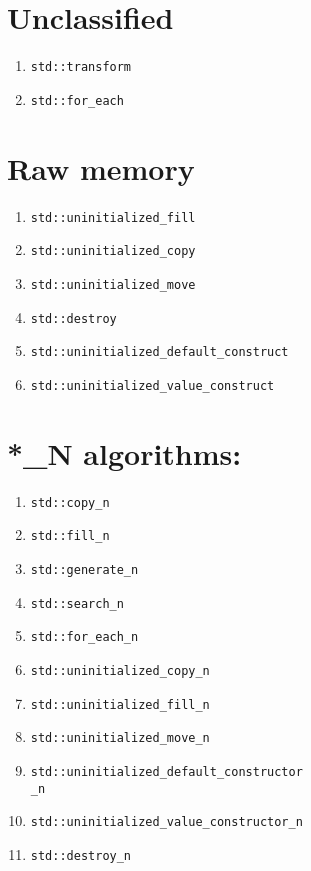 \documentclass{article}
\begin{document}
\begin{multicols}{3}
\section{Unclassified}
\begin{enumerate}[resume]
\setlength\itemsep{0em}
\item \texttt{std::transform}
\item \texttt{std::for\_each}
\end{enumerate}

\section{Raw memory}
\begin{enumerate}[resume]
\setlength\itemsep{0em}
\item \texttt{std::uninitialized\_fill}
\item \texttt{std::uninitialized\_copy}
\item \texttt{std::uninitialized\_move}
\item \texttt{std::destroy}
\item \small{\texttt{std::uninitialized\_default\_construct}}
\item \texttt{std::uninitialized\_value\_construct}
\end{enumerate}

\section{*\_N algorithms:}
\begin{enumerate}[resume]
\setlength\itemsep{0em}
\item \texttt{std::copy\_n}
\item \texttt{std::fill\_n}
\item \texttt{std::generate\_n}
\item \texttt{std::search\_n}
\item \texttt{std::for\_each\_n}
\item \texttt{std::uninitialized\_copy\_n}
\item \texttt{std::uninitialized\_fill\_n}
\item \texttt{std::uninitialized\_move\_n}
\item \small{\texttt{std::uninitialized\_default\_constructor\\\_n}}
\item \texttt{std::uninitialized\_value\_constructor\_n}
\item \texttt{std::destroy\_n}
\end{enumerate}
\end{multicols}
\end{document}
